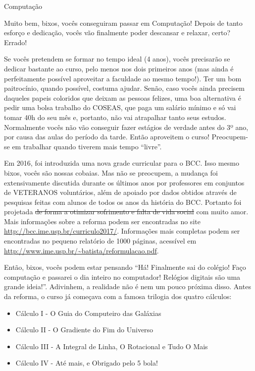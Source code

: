 \begin{subsecao}{Computação}

Muito bem, bixos, vocês conseguiram passar em Computação! Depois de tanto
esforço e dedicação, vocês vão finalmente poder descansar e relaxar, certo?
Errado!

Se vocês pretendem se formar no tempo ideal (4 anos), vocês precisarão se
dedicar bastante ao curso, pelo menos nos dois primeiros anos (mas ainda é
perfeitamente possível aproveitar a faculdade ao mesmo tempo!). Ter um bom
paitrocínio, quando possível, costuma ajudar. Senão, caso vocês ainda precisem
daqueles papeis coloridos que deixam as pessoas felizes, uma boa alternativa é
pedir uma bolsa trabalho do COSEAS, que paga um salário mínimo e só vai tomar
40h do seu mês e, portanto, não vai atrapalhar tanto seus estudos. Normalmente
vocês não vão conseguir fazer estágios de verdade antes do 3º ano, por causa
das aulas do período da tarde. Então aproveitem o curso! Preocupem-se em
trabalhar quando tiverem mais tempo ``livre''.

Em 2016, foi introduzida uma nova grade curricular para o
BCC. Isso mesmo bixos, vocês são nossas cobaias. Mas não se preocupem, a
mudança foi extensivamente discutida durante os últimos anos por professores em
conjuntos de VETERANOS voluntários, além de apoiado por dados obtidos através de
pesquisas feitas com alunos de todos os anos da história do BCC. Portanto foi
projetada \sout{de forma a otimizar sofrimento e falta de vida social} com muito
amor. Mais informações sobre a reforma podem ser encontradas no site
\url{http://bcc.ime.usp.br/curriculo2017/}. Informações mais completas podem ser
encontradas no pequeno relatório de 1000 páginas, acessível em
\url{http://www.ime.usp.br/~batista/reformulacao.pdf}.

Então, bixos, vocês podem estar pensando ``Há! Finalmente sai do colégio! Faço
computação e passarei o dia inteiro no computador! Relógios digitais são uma
grande ideia!''. Adivinhem, a realidade não é nem um pouco próxima disso. Antes
da reforma, o curso já começava com a famosa trilogia dos quatro cálculos:

\begin{itemize}
\item Cálculo I - O Guia do Computeiro das Galáxias
\item Cálculo II - O Gradiente do Fim do Universo
\item Cálculo III - A Integral de Linha, O Rotacional e Tudo O Mais
\item Cálculo IV - Até mais, e Obrigado pelo 5 bola!
\end{itemize}


\end{subsecao}
